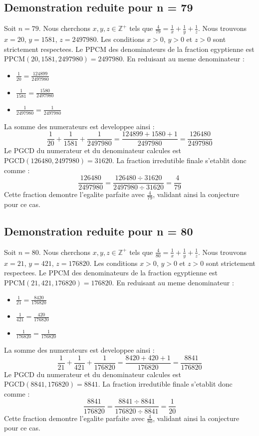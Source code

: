 \documentclass[11pt,a4paper]{article}
\begin{document}
\subsection{Demonstration reduite pour n = 79}
Soit $n = 79$. Nous cherchons $x, y, z \in \mathbb{Z}^{+}$ tels que $\frac{4}{79} = \frac{1}{x} + \frac{1}{y} + \frac{1}{z}$.
Nous trouvons $x = 20$, $y = 1581$, $z = 2497980$.
Les conditions $x > 0$, $y > 0$ et $z > 0$ sont strictement respectees.
Le PPCM des denominateurs de la fraction egyptienne est $\text{PPCM}(20, 1581, 2497980) = 2497980$.
En reduisant au meme denominateur :
\begin{itemize}
    \item $\frac{1}{20} = \frac{124899}{2497980}$
    \item $\frac{1}{1581} = \frac{1580}{2497980}$
    \item $\frac{1}{2497980} = \frac{1}{2497980}$
\end{itemize}
La somme des numerateurs est developpee ainsi :
$$ \frac{1}{20} + \frac{1}{1581} + \frac{1}{2497980} = \frac{124899 + 1580 + 1}{2497980} = \frac{126480}{2497980} $$
Le PGCD du numerateur et du denominateur calcules est $\text{PGCD}(126480, 2497980) = 31620$.
La fraction irredutible finale s'etablit donc comme :
$$ \frac{126480}{2497980} = \frac{126480 \div 31620}{2497980 \div 31620} = \frac{4}{79} $$
Cette fraction demontre l'egalite parfaite avec $\frac{4}{79}$, validant ainsi la conjecture pour ce cas.

\subsection{Demonstration reduite pour n = 80}
Soit $n = 80$. Nous cherchons $x, y, z \in \mathbb{Z}^{+}$ tels que $\frac{4}{80} = \frac{1}{x} + \frac{1}{y} + \frac{1}{z}$.
Nous trouvons $x = 21$, $y = 421$, $z = 176820$.
Les conditions $x > 0$, $y > 0$ et $z > 0$ sont strictement respectees.
Le PPCM des denominateurs de la fraction egyptienne est $\text{PPCM}(21, 421, 176820) = 176820$.
En reduisant au meme denominateur :
\begin{itemize}
    \item $\frac{1}{21} = \frac{8420}{176820}$
    \item $\frac{1}{421} = \frac{420}{176820}$
    \item $\frac{1}{176820} = \frac{1}{176820}$
\end{itemize}
La somme des numerateurs est developpee ainsi :
$$ \frac{1}{21} + \frac{1}{421} + \frac{1}{176820} = \frac{8420 + 420 + 1}{176820} = \frac{8841}{176820} $$
Le PGCD du numerateur et du denominateur calcules est $\text{PGCD}(8841, 176820) = 8841$.
La fraction irredutible finale s'etablit donc comme :
$$ \frac{8841}{176820} = \frac{8841 \div 8841}{176820 \div 8841} = \frac{1}{20} $$
Cette fraction demontre l'egalite parfaite avec $\frac{4}{80}$, validant ainsi la conjecture pour ce cas.
\end{document}
